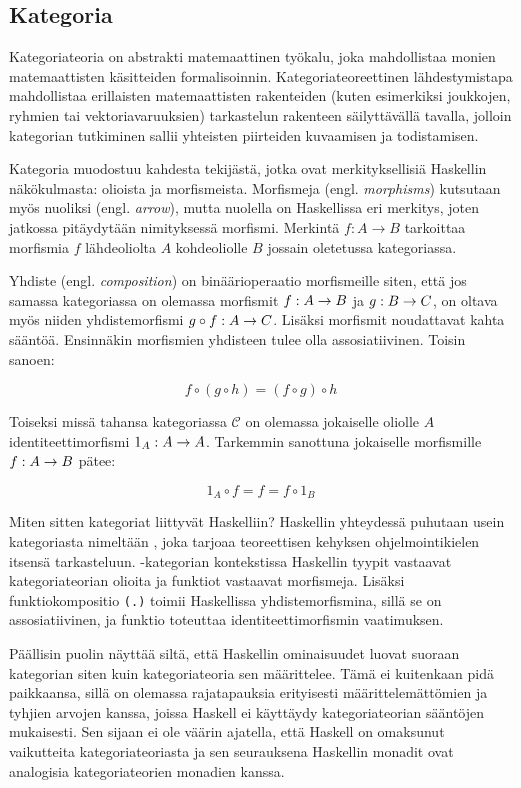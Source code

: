 \documentclass[finnish]{tktltiki2}
\begin{document}
\subsection{Kategoria}

Kategoriateoria on abstrakti matemaattinen työkalu, joka mahdollistaa monien matemaattisten
käsitteiden formalisoinnin. Kategoriateoreettinen lähdestymistapa mahdollistaa erillaisten
matemaattisten rakenteiden (kuten esimerkiksi joukkojen, ryhmien tai vektoriavaruuksien) tarkastelun
rakenteen säilyttävällä tavalla, jolloin kategorian tutkiminen sallii yhteisten piirteiden
kuvaamisen ja todistamisen.

Kategoria muodostuu kahdesta tekijästä, jotka ovat merkityksellisiä Haskellin näkökulmasta: olioista
ja morfismeista. Morfismeja (engl. \emph{morphisms}) kutsutaan myös nuoliksi (engl. \emph{arrow}),
mutta nuolella on Haskellissa eri merkitys, joten jatkossa pitäydytään nimityksessä morfismi.
Merkintä $f : A \rightarrow B$ tarkoittaa morfismia $f$ lähdeoliolta $A$ kohdeoliolle $B$ jossain
oletetussa kategoriassa.

Yhdiste (engl. \emph{composition}) on binäärioperaatio morfismeille siten, että jos samassa
kategoriassa on olemassa morfismit $f : A \rightarrow B$ ja $g : B \rightarrow C$, on oltava myös niiden
yhdistemorfismi $g \circ f : A \rightarrow C$. Lisäksi morfismit noudattavat kahta sääntöä. Ensinnäkin
morfismien yhdisteen tulee olla assosiatiivinen. Toisin sanoen:

$$f \circ (g \circ h) = (f \circ g) \circ h$$

Toiseksi missä tahansa kategoriassa $\mathcal{C}$ on olemassa jokaiselle oliolle $A$
identiteettimorfismi $1_A : A \rightarrow A$. Tarkemmin sanottuna jokaiselle morfismille $f : A \rightarrow B$
pätee:

$$ 1_A \circ f = f = f \circ 1_B $$


Miten sitten kategoriat liittyvät Haskelliin? Haskellin yhteydessä puhutaan usein kategoriasta
nimeltään , joka tarjoaa teoreettisen kehyksen ohjelmointikielen itsensä tarkasteluun.
-kategorian kontekstissa Haskellin tyypit vastaavat kategoriateorian olioita ja funktiot
vastaavat morfismeja. Lisäksi funktiokompositio \verb|(.)| toimii Haskellissa yhdistemorfismina,
sillä se on assosiatiivinen, ja funktio  toteuttaa identiteettimorfismin vaatimuksen.

Päällisin puolin näyttää siltä, että Haskellin ominaisuudet luovat suoraan kategorian siten kuin
kategoriateoria sen määrittelee. Tämä ei kuitenkaan pidä paikkaansa, sillä on olemassa rajatapauksia
erityisesti määrittelemättömien ja tyhjien arvojen kanssa, joissa Haskell ei käyttäydy
kategoriateorian sääntöjen mukaisesti. Sen sijaan ei ole väärin ajatella, että Haskell on omaksunut
vaikutteita kategoriateoriasta ja sen seurauksena Haskellin monadit ovat analogisia kategoriateorien
monadien kanssa.
\end{document}
